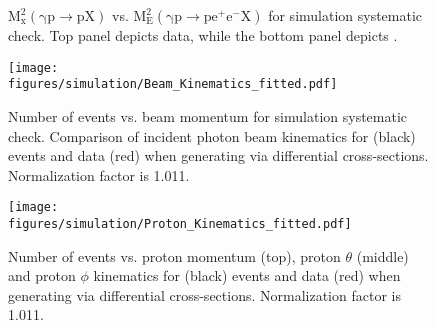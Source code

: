 \begin{figure}[h!]\begin{center}

\caption[$\mathrm{M_x^2(\gamma p \to p X)}$ vs. $\mathrm{M_E^2(\gamma p \to pe^+e^- X)}$ for simulation systematic check]{\label{fig:simsmear.mEMxP.data.MC}$\mathrm{M_x^2(\gamma p \to p X)}$ vs. $\mathrm{M_E^2(\gamma p \to pe^+e^- X)}$ for simulation systematic check. Top panel depicts data, while the bottom panel depicts .}

\end{center}\end{figure}
%
%
\begin{figure}[h!]\begin{center}
\texttt{[image: \\figures/simulation/Beam\_Kinematics\_fitted.pdf]}
\caption[Number of events vs. beam momentum for simulation systematic check]{\label{fig:simsmear.beam}Number of events vs. beam momentum for simulation systematic check. Comparison of incident photon beam kinematics for  (black) events and data (red) when generating  via differential cross-sections. Normalization factor is 1.011.}
\end{center}\end{figure} 
%
%
\begin{figure}[h!]\begin{center}
\texttt{[image: \\figures/simulation/Proton\_Kinematics\_fitted.pdf]}
\caption[Number of events vs. proton momentum (top), proton $\theta$ (middle) and proton $\phi$ kinematics for  (black) events and data (red) when generating  via differential cross-sections]{\label{fig:simsmear.prot}Number of events vs. proton momentum (top), proton $\theta$ (middle) and proton $\phi$ kinematics for  (black) events and data (red) when generating  via differential cross-sections. Normalization factor is 1.011. }
\end{center}\end{figure} 
